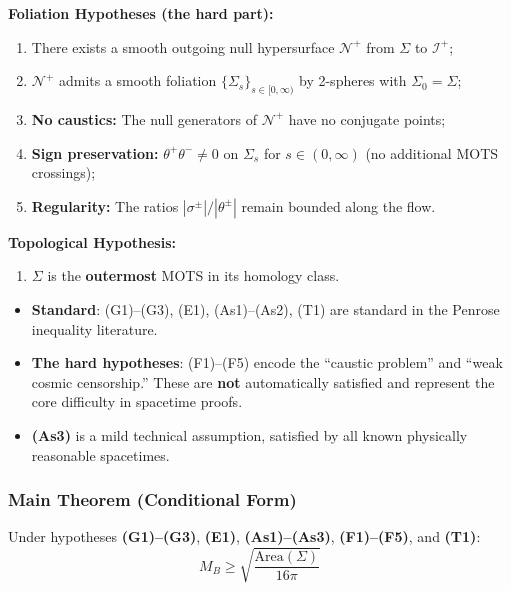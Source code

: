 \begin{remark}
\textbf{Foliation Hypotheses (the hard part):}
\begin{enumerate}[label=\textbf{(F\arabic*)}]
\item There exists a smooth outgoing null hypersurface $\mathcal{N}^+$ from $\Sigma$ to $\mathscr{I}^+$;
\item $\mathcal{N}^+$ admits a smooth foliation $\{\Sigma_s\}_{s \in [0,\infty)}$ by 2-spheres with $\Sigma_0 = \Sigma$;
\item \textbf{No caustics:} The null generators of $\mathcal{N}^+$ have no conjugate points;
\item \textbf{Sign preservation:} $\theta^+\theta^- \neq 0$ on $\Sigma_s$ for $s \in (0, \infty)$ (no additional MOTS crossings);
\item \textbf{Regularity:} The ratios $|\sigma^\pm|/|\theta^\pm|$ remain bounded along the flow.
\end{enumerate}

\textbf{Topological Hypothesis:}
\begin{enumerate}[label=\textbf{(T1)}]
\item $\Sigma$ is the \textbf{outermost} MOTS in its homology class.
\end{enumerate}
\end{remark}

\begin{remark}
\begin{itemize}
\item \textbf{Standard}: (G1)--(G3), (E1), (As1)--(As2), (T1) are standard in the Penrose inequality literature.
\item \textbf{The hard hypotheses}: (F1)--(F5) encode the ``caustic problem'' and ``weak cosmic censorship.'' These are \textbf{not} automatically satisfied and represent the core difficulty in spacetime proofs.
\item \textbf{(As3)} is a mild technical assumption, satisfied by all known physically reasonable spacetimes.
\end{itemize}
\end{remark}

\subsubsection{Main Theorem (Conditional Form)}

\begin{theorem}
\label{thm:spacetime-penrose-conditional}
Under hypotheses \textbf{(G1)--(G3)}, \textbf{(E1)}, \textbf{(As1)--(As3)}, \textbf{(F1)--(F5)}, and \textbf{(T1)}:
\begin{equation}
\boxed{M_B \geq \sqrt{\frac{\mathrm{Area}(\Sigma)}{16\pi}}}
\end{equation}
\end{theorem}

